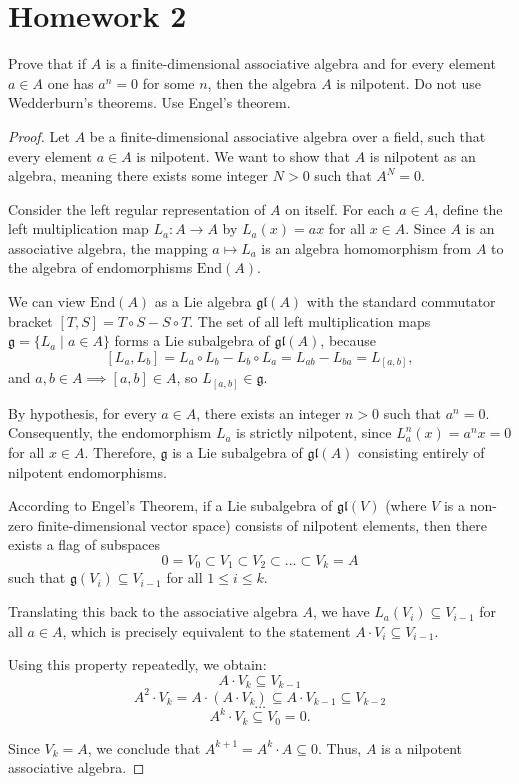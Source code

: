 \section{Homework 2}

\begin{exercise}
    Prove that if $A$ is a finite-dimensional associative algebra and for every element $a \in A$ one has $a^n = 0$ for some $n$, then the algebra $A$ is nilpotent. Do not use Wedderburn's theorems. Use Engel's theorem.
\end{exercise}

\begin{proof}
    Let $A$ be a finite-dimensional associative algebra over a field, such that every element $a \in A$ is nilpotent. We want to show that $A$ is nilpotent as an algebra, meaning there exists some integer $N > 0$ such that $A^N = 0$.

    Consider the left regular representation of $A$ on itself. For each $a \in A$, define the left multiplication map $L_a : A \to A$ by $L_a(x) = ax$ for all $x \in A$. Since $A$ is an associative algebra, the mapping $a \mapsto L_a$ is an algebra homomorphism from $A$ to the algebra of endomorphisms $\mathrm{End}(A)$.

    We can view $\mathrm{End}(A)$ as a Lie algebra $\mathfrak{gl}(A)$ with the standard commutator bracket $[T, S] = T \circ S - S \circ T$. The set of all left multiplication maps $\mathfrak{g} = \{ L_a \mid a \in A \}$ forms a Lie subalgebra of $\mathfrak{gl}(A)$, because
    \[ [L_a, L_b] = L_a \circ L_b - L_b \circ L_a = L_{ab} - L_{ba} = L_{[a,b]}, \]
    and $a, b \in A \implies [a, b] \in A$, so $L_{[a,b]} \in \mathfrak{g}$.

    By hypothesis, for every $a \in A$, there exists an integer $n > 0$ such that $a^n = 0$. Consequently, the endomorphism $L_a$ is strictly nilpotent, since $L_a^n(x) = a^n x = 0$ for all $x \in A$. Therefore, $\mathfrak{g}$ is a Lie subalgebra of $\mathfrak{gl}(A)$ consisting entirely of nilpotent endomorphisms.

    According to Engel's Theorem, if a Lie subalgebra of $\mathfrak{gl}(V)$ (where $V$ is a non-zero finite-dimensional vector space) consists of nilpotent elements, then there exists a flag of subspaces
    \[ 0 = V_0 \subset V_1 \subset V_2 \subset \dots \subset V_k = A \]
    such that $\mathfrak{g}(V_i) \subseteq V_{i-1}$ for all $1 \le i \le k$.

    Translating this back to the associative algebra $A$, we have $L_a(V_i) \subseteq V_{i-1}$ for all $a \in A$, which is precisely equivalent to the statement $A \cdot V_i \subseteq V_{i-1}$.

    Using this property repeatedly, we obtain:
    \[ A \cdot V_k \subseteq V_{k-1} \]
    \[ A^2 \cdot V_k = A \cdot (A \cdot V_k) \subseteq A \cdot V_{k-1} \subseteq V_{k-2} \]
    \[ \dots \]
    \[ A^k \cdot V_k \subseteq V_0 = 0. \]

    Since $V_k = A$, we conclude that $A^{k+1} = A^k \cdot A \subseteq 0$. Thus, $A$ is a nilpotent associative algebra.
\end{proof}

